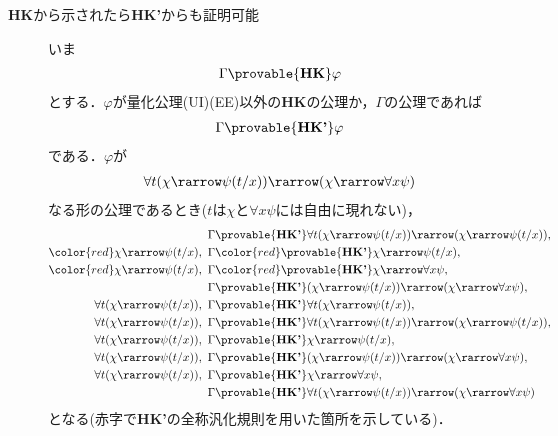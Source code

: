 \begin{metaprf}
\begin{description}
		\item[{\bf HK}から示されたら{\bf HK'}からも証明可能]
			いま
			\begin{align}
				\Gamma \provable{\mbox{{\bf HK}}} \varphi
			\end{align}
			とする．$\varphi$が量化公理(UI)(EE)以外の{\bf HK}の公理か，$\Gamma$の公理であれば
			\begin{align}
				\Gamma \provable{\mbox{{\bf HK'}}} \varphi
			\end{align}
			である．$\varphi$が
			\begin{align}
				\forall t (\chi \rarrow \psi(t/x)) 
				\rarrow (\chi \rarrow \forall x \psi)
			\end{align}
			なる形の公理であるとき($t$は$\chi$と$\forall x \psi$には自由に現れない)，
			\begin{align}
				\Gamma &\provable{\mbox{{\bf HK'}}} 
					\forall t (\chi \rarrow \psi(t/x)) 
					\rarrow (\chi \rarrow \psi(t/x)), \\
				\color{red}\chi \rarrow \psi(t/x),\ \Gamma &
				\color{red}\provable{\mbox{{\bf HK'}}}
					\chi \rarrow \psi(t/x), \\
				\color{red}\chi \rarrow \psi(t/x),\ \Gamma &
				\color{red}\provable{\mbox{{\bf HK'}}}
					\chi \rarrow \forall x \psi, \\
				\Gamma &\provable{\mbox{{\bf HK'}}} (\chi \rarrow \psi(t/x)) 
					\rarrow (\chi \rarrow \forall x \psi), \\
				\forall t (\chi \rarrow \psi(t/x)),\ \Gamma
					&\provable{\mbox{{\bf HK'}}} \forall t (\chi \rarrow \psi(t/x)), \\
				\forall t (\chi \rarrow \psi(t/x)),\ \Gamma
					&\provable{\mbox{{\bf HK'}}} \forall t (\chi \rarrow \psi(t/x)) 
					\rarrow (\chi \rarrow \psi(t/x)), \\
				\forall t (\chi \rarrow \psi(t/x)),\ \Gamma
					&\provable{\mbox{{\bf HK'}}} \chi \rarrow \psi(t/x), \\
				\forall t (\chi \rarrow \psi(t/x)),\ \Gamma
					&\provable{\mbox{{\bf HK'}}} (\chi \rarrow \psi(t/x)) 
					\rarrow (\chi \rarrow \forall x \psi), \\
				\forall t (\chi \rarrow \psi(t/x)),\ \Gamma
					&\provable{\mbox{{\bf HK'}}} \chi \rarrow \forall x \psi, \\
				\Gamma &\provable{\mbox{{\bf HK'}}} \forall t (\chi \rarrow \psi(t/x)) 
					\rarrow (\chi \rarrow \forall x \psi)
			\end{align}
			となる(赤字で{\bf HK'}の全称汎化規則を用いた箇所を示している)．

\end{description}
\end{metaprf}
